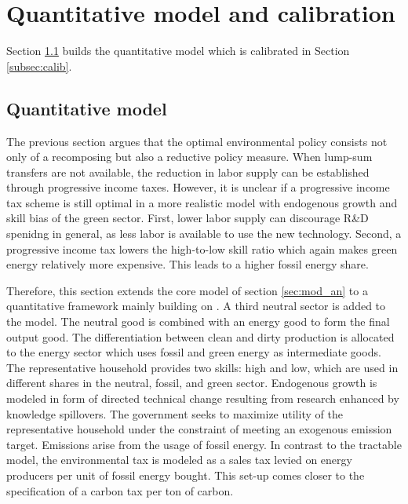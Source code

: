 \section{Quantitative model and calibration}\label{sec:model}

Section \ref{subsec:quantmod} builds the quantitative model which is calibrated in Section \ref{subsec:calib}.

\subsection{Quantitative model}\label{subsec:quantmod}
The previous section argues that the optimal environmental policy consists not only of a recomposing but also a reductive policy measure. When lump-sum transfers are not available, the reduction in labor supply can be established through progressive income taxes. 
 However, it is unclear if a progressive income tax scheme is still optimal in a more realistic model with endogenous growth and skill bias of the green sector. First, lower labor supply can discourage R\&D spenidng in general, as less labor is available to use the new technology. Second, a progressive income tax lowers the high-to-low skill ratio which again makes green energy relatively more expensive. This leads to a higher fossil energy share.%
 
Therefore, this section extends the core model of section \ref{sec:mod_an} to a quantitative framework mainly building on \cite{Fried2018ClimateAnalysis}.
A third neutral sector is added to the model. The neutral good is combined with an energy good to form  the final output good. The differentiation between clean and dirty production is allocated to the energy sector which uses fossil and green energy as intermediate goods.
The representative household provides two skills: high and low, which are used in different shares in the neutral, fossil, and green sector. 
Endogenous growth is modeled in form of directed technical change resulting from research enhanced by knowledge spillovers. The government seeks to maximize utility of the representative household under the constraint of meeting an exogenous emission target. Emissions arise from the usage of fossil energy. In contrast to the tractable model, the environmental tax is modeled as a sales tax  levied on energy producers per unit of fossil energy bought. This set-up comes closer to the specification of a carbon tax per ton of carbon. 

